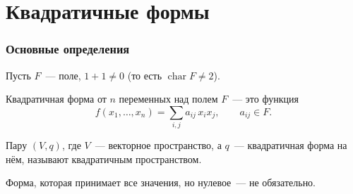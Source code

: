 \documentclass[12pt]{article}
\begin{document}

	\part{Квадратичные формы}
	\section{Основные определения}
    
    Пусть $F$~--- поле, $1+1 \neq 0$ (то есть $\operatorname{char} F \neq 2$).
    
    \begin{definition}
        Квадратичная форма от $n$ переменных над полем $F$~--- это функция
        \[
        f(x_1, \dots, x_n) = \sum\limits_{i, j} a_{ij}\, x_i x_j, \qquad a_{ij} \in F.
        \]
    \end{definition}
    
    \begin{definition}
    	Пару $(V, q)$, где $V$~--- векторное пространство, а $q$~--- квадратичная форма на нём, называют квадратичным пространством.
    \end{definition}
    
    \begin{definition}
    	Форма, которая принимает все значения, но нулевое~--- не обязательно.
	\end{definition}
    
\end{document}
